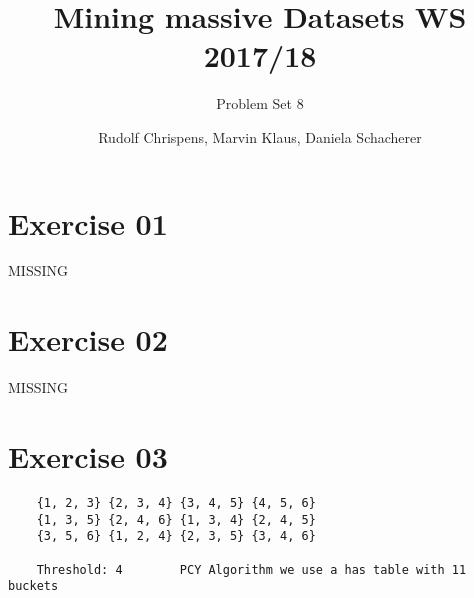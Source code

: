 \documentclass[11pt,a4paper]{scrartcl}
\title{Mining massive Datasets WS 2017/18}
\subtitle{Problem Set 8}
\author{Rudolf Chrispens, Marvin Klaus, Daniela Schacherer}
\begin{document}
\maketitle

\section*{Exercise 01}
MISSING

\section*{Exercise 02}
MISSING

\section*{Exercise 03}
	\begin{verbatim}
	{1, 2, 3} {2, 3, 4} {3, 4, 5} {4, 5, 6}
	{1, 3, 5} {2, 4, 6} {1, 3, 4} {2, 4, 5}
	{3, 5, 6} {1, 2, 4} {2, 3, 5} {3, 4, 6}
	
	Threshold: 4		PCY Algorithm we use a has table with 11 buckets
	\end{verbatim}
\end{document}
